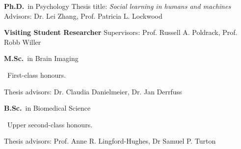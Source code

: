 
	{%
		\textbf{Ph.D.}~in Psychology}
	{%
	Thesis title: \emph{Social learning in humans and machines} \\
	Advisors: Dr. Lei Zhang, Prof. Patricia L. Lockwood}

	{%
		\hspace*{1em}\textbf{Visiting Student Researcher}}
	{%
	\hspace*{1em}Supervisors: Prof. Russell A. Poldrack, Prof. Robb Willer}

		{%
			\textbf{M.Sc.}~in Brain Imaging \begin{footnotesize}
			~First-class honours.
		\end{footnotesize}}
		{Thesis advisors: Dr. Claudia Danielmeier, Dr. Jan Derrfuss}

{%
	\textbf{B.Sc.}~in Biomedical Science \begin{footnotesize}
	~Upper second-class honours.
\end{footnotesize}}{Thesis advisors: Prof. Anne R. Lingford-Hughes, Dr Samuel P. Turton}
